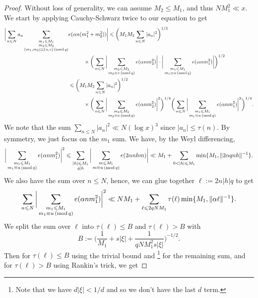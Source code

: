 \documentclass[12pt]{amsart}
\theoremstyle{definition}
\theoremstyle{definition}
\theoremstyle{remark}
\numberwithin{equation}{section}
\renewcommand{\leq}{\leqslant}
\renewcommand{\mod}[1]{\,({\rm mod}\,#1)}
\begin{document}
\begin{proof}
Without loss of generality, we can assume $M_2\leq M_1$, and thus $NM_1^2 \ll x$. We start by applying Cauchy-Schwarz twice to our equation to get
\begin{align*}
\bigg| \sum_{n\leq N} a_n \sum_{\substack{m_1\leq M_1 \\ m_2\leq M_2 \\ (m_1,m_2)\equiv (u,v)\mod q}}& e(\alpha n(m_1^2+m_2^2)) \bigg|  \leq \bigg( M_1M_2 \sum_{n\leq N} |a_n|^2 \bigg)^{1/2} \\
&\hspace{1cm}  \times\bigg( \sum_{n\leq N} \bigg|  \sum_{\substack{m_2\leq M_2 \\ m_2\equiv v\mod q}} e(\alpha nm_2^2) \bigg| \cdot \bigg|  \sum_{\substack{m_1\leq M_1 \\ m_1\equiv u\mod q}} e(\alpha nm_1^2) \bigg| \bigg)^{1/2} \\
&\leq \bigg( M_1M_2 \sum_{n\leq N} |a_n|^2 \bigg)^{1/2} \\
&\hspace{1cm}\times\bigg( \sum_{n\leq N} \bigg|  \sum_{\substack{m_2\leq M_2 \\ m_2\equiv v\mod q}} e(\alpha nm_2^2) \bigg|^2 \bigg)^{1/4} \bigg( \sum_{n\leq N} \bigg|  \sum_{\substack{m_1\leq M_1 \\ m_1\equiv u\mod q}} e(\alpha nm_1^2) \bigg|^2 \bigg)^{1/4} .
\end{align*}
We note that the sum $\sum_{n\leq N} |a_n|^2 \ll N (\log x)^3$ since $|a_n|\leq \tau(n)$. By symmetry, we just focus on the $m_1$ sum. We have, by the Weyl differencing,
$$ \bigg|\sum_{\substack{m_1\leq M_1 \\ m_1\equiv u\mod q}} e(\alpha nm_1^2) \bigg|^2 \leq \sum_{\substack{|h|\leq M_1 \\ q|h}} \bigg| \sum_{\substack{m\leq M_1 \\ m\equiv u \mod q}} e(2\alpha n h m) \bigg| \ll M_1 +  \sum_{0<|h|\leq M_1} \min\{ M_1 , \| 2\alpha q n h \|^{-1} \} . $$
We also have the sum over $n\leq N$, hence, we can glue together $\ell:=2n|h|q$ to get
$$ \sum_{n\leq N}\bigg|\sum_{\substack{m_1\leq M_1 \\ m_1\equiv u\mod q}} e(\alpha nm_1^2) \bigg|^2  \ll NM_1 + \sum_{\ell \leq 2qNM_1} \tau(\ell) \min\{ M_1 , \|\alpha \ell \|^{-1} \} . $$
We split the sum over $\ell$ into $\tau(\ell)\leq B$ and $\tau(\ell) > B$ with
$$ B:= \bigg( \frac{1}{M_1} + s|\xi| + \frac{1}{qNM_1^2 s|\xi|}\bigg)^{-1/2}. $$
Then for $\tau(\ell)\leq B$ using the trivial bound and \cite[Lemma 4.1]{MR4452438}\footnote{Note that we have $d|\xi|<1/d$ and so we don't have the last $d$ term.} for the remaining sum, and for $\tau(\ell)>B$ using Rankin's trick, we get

\end{proof}
\end{document}
